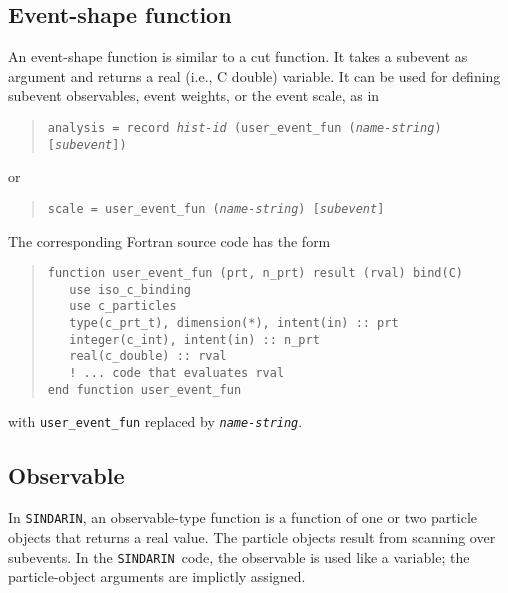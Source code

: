 \documentclass[12pt]{book}
\newcommand{\ttt}[1]{\texttt{#1}}
\newcommand{\sindarin}{\texttt{SINDARIN}}
\begin{document}
\subsection{Event-shape function}

An event-shape function is similar to a cut function.  It takes a
subevent as argument and returns a real (i.e., C double) variable.  It
can be used for defining subevent observables, event weights, or the
event scale, as in
\begin{quote}
\begin{footnotesize}
  \ttt{analysis = record \emph{hist-id} (user\_event\_fun (\emph{name-string}) [\emph{subevent}])}
\end{footnotesize}
\end{quote}
or
\begin{quote}
\begin{footnotesize}
  \ttt{scale = user\_event\_fun (\emph{name-string}) [\emph{subevent}]}
\end{footnotesize}
\end{quote}
The corresponding Fortran source code has the form
\begin{quote}
\begin{footnotesize}
\begin{verbatim}
function user_event_fun (prt, n_prt) result (rval) bind(C)
   use iso_c_binding
   use c_particles
   type(c_prt_t), dimension(*), intent(in) :: prt
   integer(c_int), intent(in) :: n_prt
   real(c_double) :: rval
   ! ... code that evaluates rval
end function user_event_fun
\end{verbatim}
\end{footnotesize}
\end{quote}
with \ttt{user\_event\_fun} replaced by \ttt{\emph{name-string}}.

\subsection{Observable}

In \sindarin, an observable-type function is a function of one or two
particle objects that returns a real value.  The particle objects
result from scanning over subevents.  In the \sindarin\ code, the
observable is used like a variable; the particle-object arguments are
implictly assigned.
\end{document}
